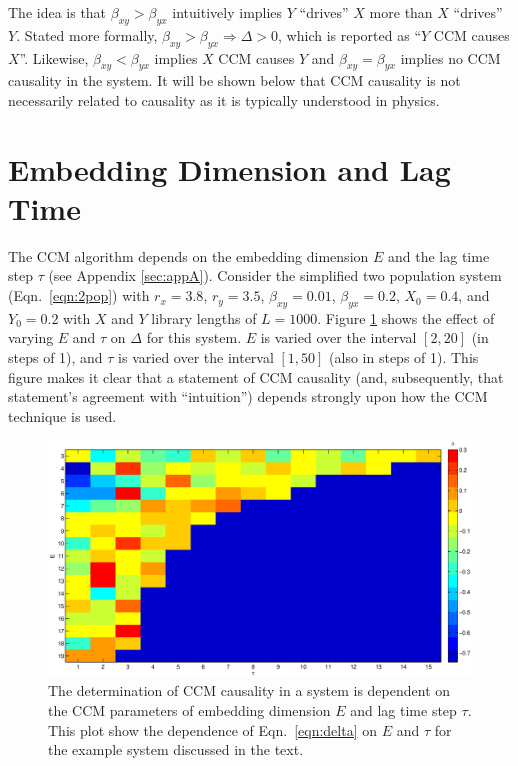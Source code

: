\documentclass[a4paper,11pt]{article}
\begin{document}
The idea is that $\beta_{xy}>\beta_{yx}$ intuitively implies $Y$ ``drives'' $X$ more than $X$ ``drives'' $Y$.  Stated more formally, $\beta_{xy}>\beta_{yx}\Rightarrow\Delta>0$, which is reported as ``$Y$ CCM causes $X$''.  Likewise, $\beta_{xy}<\beta_{yx}$ implies $X$ CCM causes $Y$ and $\beta_{xy}=\beta_{yx}$ implies no CCM causality in the system.  It will be shown below that CCM causality is not necessarily related to causality as it is typically understood in physics.

\section{Embedding Dimension and Lag Time}
The CCM algorithm depends on the embedding dimension $E$ and the lag time step $\tau$ (see Appendix \ref{sec:appA}).  Consider the simplified two population system (Eqn.\ \ref{eqn:2pop}) with $r_x=3.8$, $r_y=3.5$, $\beta_{xy}=0.01$, $\beta_{yx}=0.2$, $X_0=0.4$, and $Y_0=0.2$ with $X$ and $Y$ library lengths of $L=1000$.  Figure \ref{fig:} shows the effect of varying $E$ and $\tau$ on $\Delta$ for this system.  $E$ is varied over the interval $[2,20]$ (in steps of 1), and $\tau$ is varied over the interval $[1,50]$ (also in steps of 1).  This figure makes it clear that a statement of CCM causality (and, subsequently, that statement's agreement with ``intuition'') depends strongly upon how the CCM technique is used.
\begin{figure}[ht]
\label{fig:}
\includegraphics[scale=0.5]{Figure2.eps}
\caption{The determination of CCM causality in a system is dependent on the CCM parameters of embedding dimension $E$ and lag time step $\tau$.  This plot show the dependence of Eqn.\ \ref{eqn:delta} on $E$ and $\tau$ for the example system discussed in the text.}
\end{figure}
\end{document}
